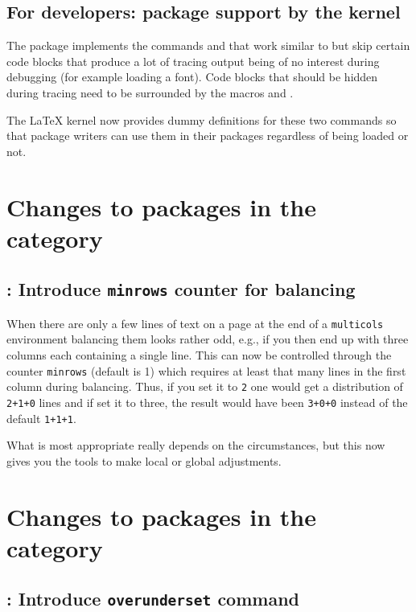 \documentclass{ltnews}
\providecommand\env[1]{\texttt{#1}}
\begin{document}
\subsection{For developers:  package support by the kernel}

The  package implements the commands 
and  that work similar to  but skip
certain code blocks that produce a lot of tracing output being of no
interest during debugging (for example loading a font).
Code blocks that should be hidden during tracing need
to be surrounded by the macros 
and .

The \LaTeX{} kernel now provides dummy definitions for these two
commands so that package writers can use them in their packages
regardless of  being loaded or not.



        
\section{Changes to packages in the  category}

\subsection{: Introduce \texttt{minrows} counter for balancing}

When there are only a few lines of text on a page at the end of a
\env{multicols} environment balancing them looks rather odd, e.g., if
you then end up with three columns each containing a single line. This
can now be controlled through the counter \texttt{minrows} (default is
1) which requires at least that many lines in the first column during
balancing. Thus, if you set it to \texttt{2} one would get a
distribution of \texttt{2+1+0} lines and if set it to three, the result
would have been \texttt{3+0+0} instead of the default \texttt{1+1+1}.

What is most appropriate really depends on the circumstances, but this
now gives you the tools to make local or global adjustments.


        
\section{Changes to packages in the  category}

\subsection{: Introduce \texttt{overunderset} command}
\end{document}
